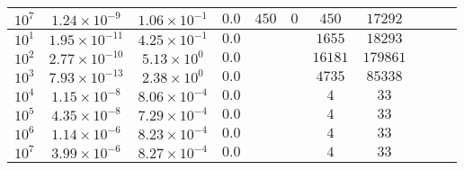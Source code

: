 \begin{tabular}{l c c c c c c c c c c}
$10^7$  &  $1.24 \times 10^{-9}$  &  $1.06 \times 10^{-1}$  &  $0.0$  &  $450$  &  $0$  &  $450$  &  $17292$  & & & \\ 
\hline \hline
    $10^1$  &  $1.95 \times 10^{-11}$  &  $4.25 \times 10^{-1}$ & $0.0$ &  &  & $1655$ & $18293$ & & & \\ 
    $10^2$  &  $2.77 \times 10^{-10}$  &  $5.13 \times 10^{0}$ & $0.0$ &  &  & $16181$ & $179861$ & & & \\ 
$10^3$  &  $7.93 \times 10^{-13}$  &  $2.38 \times 10^{0}$ & $0.0$ &  &  & $4735$ & $85338$ & & & \\ 
$10^4$  &  $1.15 \times 10^{-8}$  &  $8.06 \times 10^{-4}$ & $0.0$ &  &  & $4$ & $33$ & & & \\ 
$10^5$  &  $4.35 \times 10^{-8}$  &  $7.29 \times 10^{-4}$ & $0.0$ &  &  & $4$ & $33$ & & & \\ 
$10^6$  &  $1.14 \times 10^{-6}$  &  $8.23 \times 10^{-4}$ & $0.0$ &  &  & $4$ & $33$ & & & \\ 
$10^7$  &  $3.99 \times 10^{-6}$  &  $8.27 \times 10^{-4}$ & $0.0$ &  &  & $4$ & $33$ & & & \\ 
\end{tabular}
